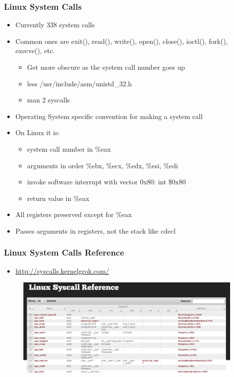 \documentclass[11pt,xcolor=dvipsnames]{beamer}
\newcommand{\mvs}{\vspace{-0.95em}}
\begin{document}
\begin{frame}[fragile,t]
\frametitle{Linux System Calls}
\mvs
\begin{itemize}
  \item Currently 338 system calls
  \item Common ones are {\ttfamily exit(), read(), write(), open(), close(), ioctl(), fork(), execve()}, etc.
  \pause
  \begin{itemize}
  \item Get more obscure as the system call number goes up
  \item {\ttfamily less /usr/include/asm/unistd\_32.h}
  \item {\ttfamily man 2 syscalls}
  \end{itemize}
  \pause
  \item Operating System specific convention for making a system call
  \item On Linux it is:
  \begin{itemize}
    \item system call number in {\ttfamily \%eax}
    \item arguments in order {\ttfamily \%ebx, \%ecx, \%edx, \%esi, \%edi}
    \item invoke software interrupt with vector {\ttfamily 0x80}: {\ttfamily int \$0x80}
    \item return value in \%eax
  \end{itemize}
  \item All registers preserved except for {\ttfamily \%eax}
  \item Passes arguments in registers, not the stack like {\ttfamily cdecl}
\end{itemize}
\end{frame}

\begin{frame}[fragile,t]
\frametitle{Linux System Calls Reference}
\begin{itemize}
  \item \url{http://syscalls.kernelgrok.com/}
\end{itemize}
\begin{figure}
\centering
\includegraphics[height=0.50\paperheight]{figures/syscalls.png}
\end{figure}
\end{frame}
\end{document}
